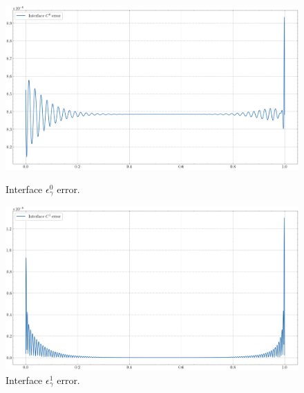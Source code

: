 \begin{figure}[!htb]
    \centering
    \begin{minipage}{.5\textwidth}
      \centering
      \includegraphics[width=1\linewidth]{Images/Transmission/L_shape_2_axis_c0_error_k1_2_enr.png}
      \caption{Interface \(\epsilon_\gamma^0\) error.}
      \label{transmission_L_axis_error_c0_k1_2}
    \end{minipage}%
    \begin{minipage}{.5\textwidth}
      \centering
      \includegraphics[width=1\linewidth]{Images/Transmission/L_shape_2_axis_c1_error_k1_2_enr.png}
      \caption{Interface \(\epsilon_\gamma^1\) error.}
      \label{transmission_L_axis_error_c1_k1_2}
    \end{minipage}
    
    \vspace{0.5cm} %
    

\end{figure}
